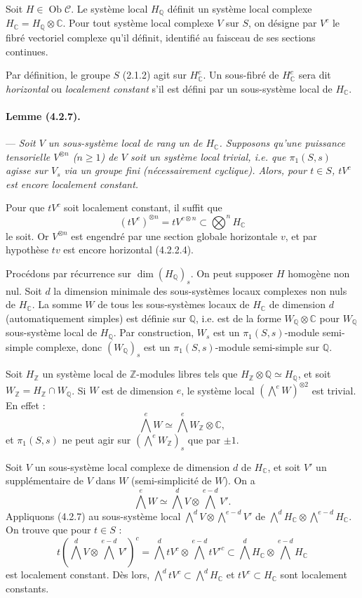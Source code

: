 \documentclass[10pt]{article}
\newcommand{\C}{\mathbb C}
\newcommand{\Q}{\mathbb Q}
\newcommand{\Z}{\mathbb Z}
\newcommand{\fg}{\guillemotright}
\newcommand{\og}{\guillemotleft}
\newcommand{\Ob}{\operatorname{Ob}}
\begin{document}
Soit $H\in\Ob\mathcal C$. Le système local $H_\Q$ définit un système local complexe $H_\C=H_\Q\otimes\C$. Pour tout système local complexe $V$ sur $S$, on désigne par $V^c$ le fibré vectoriel complexe qu'il définit, identifié au faisceau de ses sections continues.

Par définition, le groupe $S$ (2.1.2) agit sur $H_\C^c$. Un sous-fibré de $H_\C^c$ sera dit \emph{horizontal} ou \emph{localement constant} s'il est défini par un sous-système local de $H_\C$.

\paragraph{Lemme (4.2.7).} --- {\itshape Soit $V$ un sous-système local de rang un de $H_\C$. Supposons qu'une puissance tensorielle $V^{\otimes n}$ ($n\ge1$) de $V$ soit un système local trivial, i.e. que $\pi_1(S,s)$ agisse sur $V_s$ via un groupe fini (nécessairement cyclique). Alors, pour $t\in S$, $tV^c$ est encore localement constant.}

Pour que $tV^c$ soit localement constant, il suffit que
\[
(tV^c)^{\otimes n}=tV^{c\otimes n}\subset\bigotimes^n H_\C
\]
le soit. Or $V^{\otimes n}$ est engendré par une section globale horizontale $v$, et par hypothèse $tv$ est encore horizontal (4.2.2.4).

Procédons par récurrence sur $\dim(H_\Q)_s$. On peut supposer $H$ homogène non nul. Soit $d$ la dimension minimale des sous-systèmes locaux complexes non nuls de $H_\C$. La somme $W$ de tous les sous-systèmes locaux de $H_\C$ de dimension $d$ (automatiquement simples) est \og définie sur $\Q$\fg, i.e. est de la forme $W_\Q\otimes\C$ pour $W_\Q$ sous-système local de $H_\Q$. Par construction, $W_s$ est un $\pi_1(S,s)$-module semi-simple complexe, donc $(W_\Q)_s$ est un $\pi_1(S,s)$-module semi-simple sur $\Q$.

Soit $H_\Z$ un système local de $\Z$-modules libres tels que $H_\Z\otimes\Q\simeq H_\Q$, et soit $W_\Z=H_\Z\cap W_\Q$. Si $W$ est de dimension $e$, le système local $(\bigwedge^e W)^{\otimes2}$ est trivial. En effet :
\[
\bigwedge^e W\simeq \bigwedge^e W_\Z\otimes\C,
\]
et $\pi_1(S,s)$ ne peut agir sur $(\bigwedge^eW_\Z)_s$ que par $\pm1$.

Soit $V$ un sous-système local complexe de dimension $d$ de $H_\C$, et soit $V'$ un supplémentaire de $V$ dans $W$ (semi-simplicité de $W$). On a
\[
\bigwedge^e W\simeq \bigwedge^d V\otimes\bigwedge^{e-d}V'.
\]
Appliquons (4.2.7) au sous-système local $\bigwedge^dV\otimes\bigwedge^{e-d}V'$ de $\bigwedge^dH_\C\otimes\bigwedge^{e-d}H_\C$. On trouve que pour $t\in S$ :
\[
t(\bigwedge^dV\otimes\bigwedge^{e-d}V')^c=
\bigwedge^d tV^c\otimes\bigwedge^{e-d}tV'^c
\subset \bigwedge^dH_\C\otimes\bigwedge^{e-d}H_\C
\]
est localement constant. Dès lors, $\bigwedge^d tV^c\subset\bigwedge^dH_\C$ et $tV^c\subset H_\C$ sont localement constants.
\end{document}
